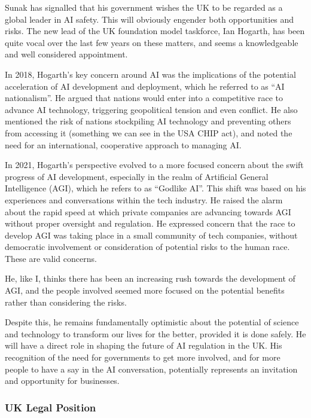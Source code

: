 Sunak has signalled that his government wishes the UK to be regarded as a global leader in AI safety. This will obviously engender both opportunities and risks. The new lead of the UK foundation model taskforce, Ian Hogarth, has been quite vocal over the last few years on these matters, and seems a knowledgeable and well considered appointment.\par
In 2018, Hogarth's key concern around AI was the implications of the potential acceleration of AI development and deployment, which he referred to as ``AI nationalism''. He argued that nations would enter into a competitive race to advance AI technology, triggering geopolitical tension and even conflict. He also mentioned the risk of nations stockpiling AI technology and preventing others from accessing it (something we can see in the USA CHIP act), and noted the need for an international, cooperative approach to managing AI.\par
In 2021, Hogarth’s perspective evolved to a more focused concern about the swift progress of AI development, especially in the realm of Artificial General Intelligence (AGI), which he refers to as ``Godlike AI''. This shift was based on his experiences and conversations within the tech industry. He raised the alarm about the rapid speed at which private companies are advancing towards AGI without proper oversight and regulation.  He expressed concern that the race to develop AGI was taking place in a small community of tech companies, without democratic involvement or consideration of potential risks to the human race. These are valid concerns.\par
He, like I, thinks there has been an increasing rush towards the development of AGI, and the people involved seemed more focused on the potential benefits rather than considering the risks. \par 
Despite this, he remains fundamentally optimistic about the potential of science and technology to transform our lives for the better, provided it is done safely. He will have a direct role in shaping the future of AI regulation in the UK. His recognition of the need for governments to get more involved, and for more people to have a say in the AI conversation, potentially represents an invitation and opportunity for businesses. 

\subsubsection{UK Legal Position}

